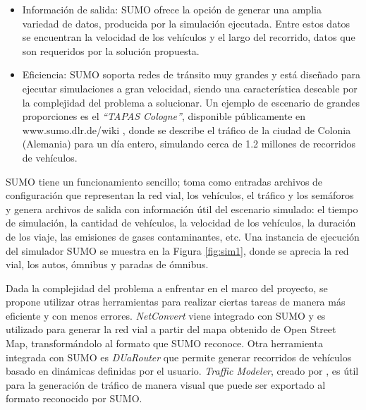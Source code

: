 \begin{itemize}
	\item Información de salida: SUMO ofrece la opción de generar una amplia variedad de datos, producida por la simulación ejecutada. Entre estos datos se encuentran la velocidad de los vehículos y el largo del recorrido, datos que son requeridos por la solución propuesta.
	
	\item Eficiencia: SUMO soporta redes de tránsito muy grandes y está diseñado para ejecutar simulaciones a gran velocidad, siendo una característica deseable por la complejidad del problema a solucionar. Un ejemplo de escenario de grandes proporciones es el \emph{``TAPAS Cologne''}, disponible públicamente en www.sumo.dlr.de/wiki , donde se describe el tráfico de la ciudad de Colonia (Alemania) para un día entero, simulando cerca de 1.2 millones de recorridos de vehículos.
	
\end{itemize}


SUMO tiene un funcionamiento sencillo; toma como entradas archivos de configuración que representan la red vial, los vehículos, el tráfico y los semáforos y genera archivos de salida con información útil del escenario simulado: el tiempo de simulación, la cantidad de vehículos, la velocidad de los vehículos, la duración de los viaje, las emisiones de gases contaminantes, etc. Una instancia de ejecución del simulador SUMO se muestra en la Figura \ref{fig:sim1}, donde se aprecia la red vial, los autos, ómnibus y paradas de ómnibus.

Dada la complejidad del problema a enfrentar en el marco del proyecto, se propone utilizar otras herramientas para realizar ciertas tareas de manera más eficiente y con menos errores. \emph{NetConvert} viene integrado con SUMO y es utilizado para generar la red vial a partir del mapa obtenido de Open Street Map, transformándolo al formato que SUMO reconoce. Otra herramienta integrada con SUMO es \emph{DUaRouter} que permite generar recorridos de vehículos basado en dinámicas definidas por el usuario. \emph{Traffic Modeler}, creado por \citet{TrafficModeler}, es útil para la generación de tráfico de manera visual que puede ser exportado al formato reconocido por SUMO. 
	


